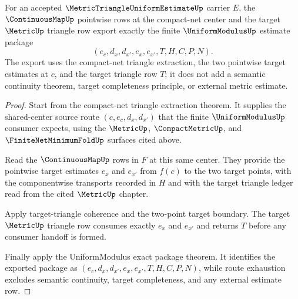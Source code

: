 \begin{theorem}
\label{thm:metric-triangle-uniform-estimate-uniform-modulus-export}
For an accepted $\MetricTriangleUniformEstimateUp$ carrier $E$, the $\ContinuousMapUp$ pointwise rows at the compact-net center and the target $\MetricUp$ triangle row export exactly the finite $\UniformModulusUp$ estimate package
$$
(e_c,d_x,d_{x'},e_x,e_{x'},T,H,C,P,N).
$$
The export uses the compact-net triangle extraction, the two pointwise target estimates at $c$, and the target triangle row $T$; it does not add a semantic continuity theorem, target completeness principle, or external metric estimate.
\end{theorem}
\begin{proof}
Start from the compact-net triangle extraction theorem. It supplies the shared-center source route $(c,e_c,d_x,d_{x'})$ that the finite $\UniformModulusUp$ consumer expects, using the $\MetricUp$, $\CompactMetricUp$, and $\FiniteNetMinimumFoldUp$ surfaces cited above.

Read the $\ContinuousMapUp$ rows in $F$ at this same center. They provide the pointwise target estimates $e_x$ and $e_{x'}$ from $f(c)$ to the two target points, with the componentwise transports recorded in $H$ and with the target triangle ledger read from the cited $\MetricUp$ chapter.

Apply target-triangle coherence and the two-point target boundary. The target $\MetricUp$ triangle row consumes exactly $e_x$ and $e_{x'}$ and returns $T$ before any consumer handoff is formed.

Finally apply the UniformModulus exact package theorem. It identifies the exported package as $(e_c,d_x,d_{x'},e_x,e_{x'},T,H,C,P,N)$, while route exhaustion excludes semantic continuity, target completeness, and any external estimate row.
\end{proof}


